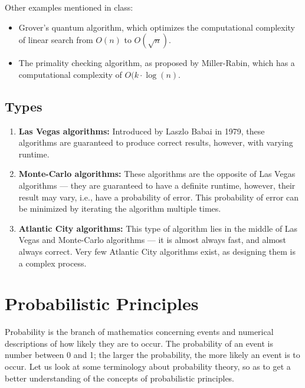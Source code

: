         Other examples mentioned in class:
            \begin{itemize}
                \item Grover's quantum algorithm, which optimizes the computational complexity of linear search from \(O(n)\) to \(O(\sqrt{n})\).

                \item The primality checking algorithm, as proposed by Miller-Rabin, which has a computational complexity of \(O(k \cdot \log(n)\).
            \end{itemize}

    \subsection*{Types}
        \begin{enumerate}
            \item \textbf{Las Vegas algorithms: }Introduced by Laszlo Babai in 1979, these algorithms are guaranteed to produce correct results, however, with varying runtime.

            \item \textbf{Monte-Carlo algorithms: }These algorithms are the opposite of Las Vegas algorithms --- they are guaranteed to have a definite runtime, however, their result may vary, i.e., have a probability of error. This probability of error can be minimized by iterating the algorithm multiple times.

            \item \textbf{Atlantic City algorithms: }This type of algorithm lies in the middle of Las Vegas and Monte-Carlo algorithms --- it is almost always fast, and almost always correct. Very few Atlantic City algorithms exist, as designing them is a complex process.
        \end{enumerate}

\section*{Probabilistic Principles}
    Probability is the branch of mathematics concerning events and numerical descriptions of how likely they are to occur. The probability of an event is number between 0 and 1; the larger the probability, the more likely an event is to occur. Let us look at some terminology about probability theory, so as to get a better understanding of the concepts of probabilistic principles.

